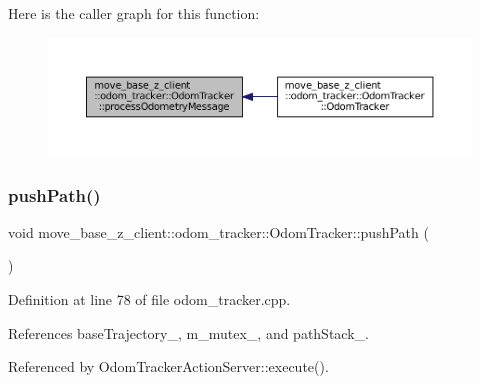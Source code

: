 Here is the caller graph for this function\+:
\nopagebreak
\begin{figure}[H]
\begin{center}
\leavevmode
\includegraphics[width=350pt]{classmove__base__z__client_1_1odom__tracker_1_1OdomTracker_a79b9f1e3b15fa6ac82dd93ab78e23579_icgraph}
\end{center}
\end{figure}
\mbox{\label{classmove__base__z__client_1_1odom__tracker_1_1OdomTracker_a2166488c9e1cd0fb94fdd963bca80ece}} 
\subsubsection{\texorpdfstring{push\+Path()}{pushPath()}}
{\footnotesize\ttfamily void move\+\_\+base\+\_\+z\+\_\+client\+::odom\+\_\+tracker\+::\+Odom\+Tracker\+::push\+Path (\begin{DoxyParamCaption}{ }\end{DoxyParamCaption})}



Definition at line 78 of file odom\+\_\+tracker.\+cpp.



References base\+Trajectory\+\_\+, m\+\_\+mutex\+\_\+, and path\+Stack\+\_\+.



Referenced by Odom\+Tracker\+Action\+Server\+::execute().


